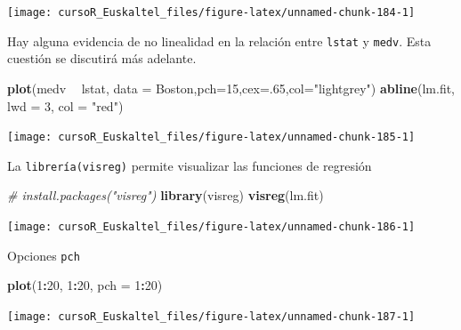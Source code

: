 \documentclass[]{book}
\newenvironment{Shaded}{\begin{snugshade}}{\end{snugshade}}
\newcommand{\KeywordTok}[1]{\textcolor[rgb]{0.13,0.29,0.53}{\textbf{#1}}}
\newcommand{\DataTypeTok}[1]{\textcolor[rgb]{0.13,0.29,0.53}{#1}}
\newcommand{\DecValTok}[1]{\textcolor[rgb]{0.00,0.00,0.81}{#1}}
\newcommand{\StringTok}[1]{\textcolor[rgb]{0.31,0.60,0.02}{#1}}
\newcommand{\CommentTok}[1]{\textcolor[rgb]{0.56,0.35,0.01}{\textit{#1}}}
\newcommand{\OperatorTok}[1]{\textcolor[rgb]{0.81,0.36,0.00}{\textbf{#1}}}
\newcommand{\NormalTok}[1]{#1}
\begin{document}
\begin{center}\texttt{[image: cursoR\_Euskaltel\_files/figure-latex/unnamed-chunk-184-1]} \end{center}

Hay alguna evidencia de no linealidad en la relación entre
\texttt{lstat} y \texttt{medv}. Esta cuestión se discutirá más adelante.

\begin{Shaded}
\begin{Highlighting}[]
\KeywordTok{plot}\NormalTok{(medv }\OperatorTok{~}\StringTok{ }\NormalTok{lstat, }\DataTypeTok{data =}\NormalTok{ Boston,}\DataTypeTok{pch=}\DecValTok{15}\NormalTok{,}\DataTypeTok{cex=}\NormalTok{.}\DecValTok{65}\NormalTok{,}\DataTypeTok{col=}\StringTok{"lightgrey"}\NormalTok{)}
\KeywordTok{abline}\NormalTok{(lm.fit, }\DataTypeTok{lwd =} \DecValTok{3}\NormalTok{, }\DataTypeTok{col =} \StringTok{"red"}\NormalTok{)}
\end{Highlighting}
\end{Shaded}

\begin{center}\texttt{[image: cursoR\_Euskaltel\_files/figure-latex/unnamed-chunk-185-1]} \end{center}

La \texttt{librería(visreg)} permite visualizar las funciones de
regresión

\begin{Shaded}
\begin{Highlighting}[]
\CommentTok{# install.packages("visreg")}
\KeywordTok{library}\NormalTok{(visreg)}
\KeywordTok{visreg}\NormalTok{(lm.fit)}
\end{Highlighting}
\end{Shaded}

\begin{center}\texttt{[image: cursoR\_Euskaltel\_files/figure-latex/unnamed-chunk-186-1]} \end{center}

Opciones \texttt{pch}

\begin{Shaded}
\begin{Highlighting}[]
\KeywordTok{plot}\NormalTok{(}\DecValTok{1}\OperatorTok{:}\DecValTok{20}\NormalTok{, }\DecValTok{1}\OperatorTok{:}\DecValTok{20}\NormalTok{, }\DataTypeTok{pch =} \DecValTok{1}\OperatorTok{:}\DecValTok{20}\NormalTok{)}
\end{Highlighting}
\end{Shaded}

\begin{center}\texttt{[image: cursoR\_Euskaltel\_files/figure-latex/unnamed-chunk-187-1]} \end{center}
\end{document}
